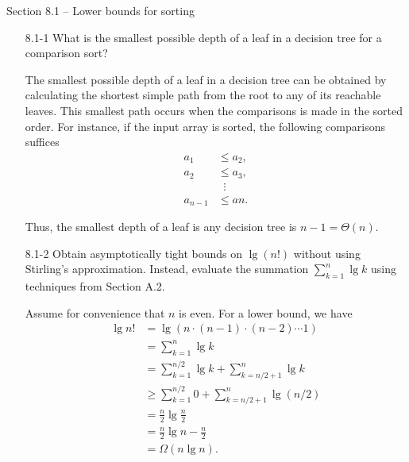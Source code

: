 
{\large Section 8.1 {--} Lower bounds for sorting}

\begin{enumerate}

\item[8.1{-}1]{What is the smallest possible depth of a leaf in a decision tree
for a comparison sort?}

\begin{framed}
The smallest possible depth of a leaf in a decision tree
can be obtained by calculating the shortest simple path from the root to any
of its reachable leaves. This smallest path occurs when the comparisons is made
in the sorted order. For instance, if the input array is sorted, the following
comparisons suffices
\begin{equation*}
\begin{aligned}
  a_1 &\le a_2,\\
  a_2 &\le a_3,\\
  &\;\;\vdots\\
  a_{n - 1} &\le a{n}.
\end{aligned}
\end{equation*}

Thus, the smallest depth of a leaf is any decision tree is $n - 1 = \Theta(n)$.

\end{framed}

\item[8.1{-}2]{Obtain asymptotically tight bounds on $\lg(n!)$ without using
Stirling's approximation. Instead, evaluate the summation $\sum_{k = 1}^n \lg k$
using techniques from Section A.2.}

\begin{framed}
Assume for convenience that $n$ is even. For a lower bound, we have
\begin{equation*}
\begin{aligned}
  \lg{n!} &=   \lg(n \cdot (n - 1) \cdot (n - 2) \cdots 1)\\
          &=   \sum_{k = 1}^{n} \lg k\\
          &=   \sum_{k = 1}^{n/2} \lg k + \sum_{k = n/2 + 1}^{n} \lg k\\
          &\ge \sum_{k = 1}^{n/2} 0 + \sum_{k = n/2 + 1}^{n} \lg (n/2)\\
          &=   \frac{n}{2} \lg{\frac{n}{2}}\\
          &=   \frac{n}{2} \lg n - \frac{n}{2}\\
          &=   \Omega(n \lg n).
\end{aligned}
\end{equation*}


\end{framed}
\end{enumerate}
